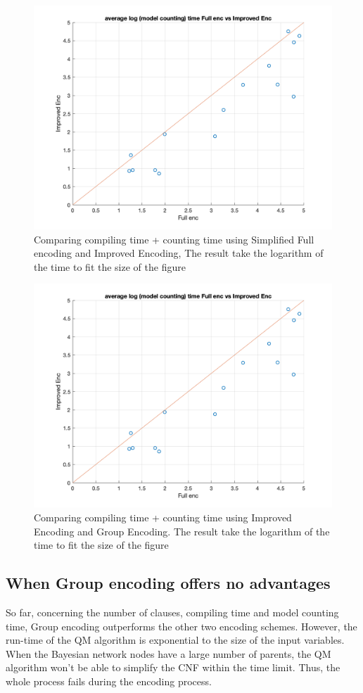 \begin{figure}
    \centering
    \includegraphics[width = 0.7 \textwidth]{pic/log_time_fullvsImproved.png}
    \caption{Comparing compiling time + counting time using Simplified Full encoding and Improved Encoding, The result take the logarithm of the time to fit the size of the figure}
    \label{fig:time_enc1v2}
\end{figure}

\begin{figure}
    \centering
    \includegraphics[width = 0.7 \textwidth]{pic/log_time_fullvsImproved.png}
    \caption{Comparing compiling time + counting time using Improved Encoding and Group Encoding. The result take the logarithm of the time to fit the size of the figure}
    \label{fig:time_enc2v3}
\end{figure}

\subsection{When Group encoding offers no advantages}
So far, concerning the number of clauses, compiling time and model counting time, Group encoding outperforms the other two encoding schemes. However, the run-time of the QM algorithm is exponential to the size of the input variables. When the Bayesian network nodes have a large number of parents, the QM algorithm won't be able to simplify the CNF within the time limit. Thus, the whole process fails during the encoding process.

